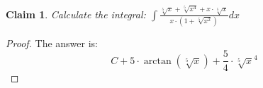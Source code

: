 \documentclass{article}
\newtheorem{theorem}{Claim}
\begin{document}
\begin{theorem}
Calculate the integral:
$
\int \frac{ \sqrt[5]{x}+\sqrt[5]{x^4}+x \cdot \sqrt[5]{x} }{ x \cdot \left(1+\sqrt[5]{x^2}\right) }   dx
$
\end{theorem}

\begin{proof}
The answer is:
\[
C+5\cdot\arctan\left(\sqrt[5]{x}\right)+\frac{5}{4}\cdot\sqrt[5]{x}^4
\]
\end{proof}
\end{document}
